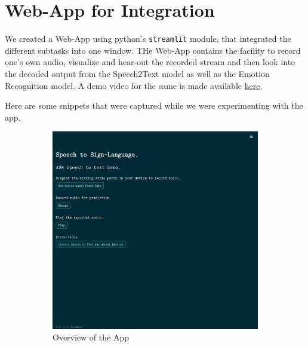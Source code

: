 \documentclass[14pt,a4paper]{article}
\begin{document}
\section{Web-App for Integration}
We created a Web-App using python's \texttt{streamlit} module, that integrated the different subtasks into one window. THe Web-App contains the facility to record one's own audio, visualize and hear-out the recorded stream and then look into the decoded output from the Speech2Text model as well as the Emotion Recognition model. A demo video for the same is made available \href{https://github.com/soham2109/CS-753-Project/blob/main/presentation/asr_project_demo_video.mkv}{here}.

Here are some snippets that were captured while we were experimenting with the app.
\begin{figure}
    \centering
    \begin{subfigure}[b]{0.3\textwidth}
    \includegraphics[width=\textwidth]{../images/streamlit_app1.png}
    \caption{Overview of the App}
    \end{subfigure}
    \begin{subfigure}[b]{0.3\textwidth}

\end{subfigure}
\end{figure}
\end{document}
